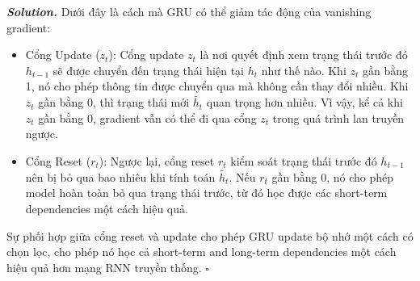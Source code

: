 \documentclass[12pt]{article}
\newenvironment{solution}[1][\it{Solution}]{\textbf{#1. } }{$\square$}
\begin{document}
\begin{solution}
	Dưới đây là cách mà GRU có thể giảm tác động của vanishing gradient:

	\begin{itemize}
		\item Cổng Update ($z_t$):
		Cổng update $z_t$ là nơi quyết định xem trạng thái trước đó $h_{t-1}$ sẽ được chuyển đến trạng thái hiện tại $h_t$ như thế nào. Khi $z_t$ gần bằng 1, nó cho phép thông tin được chuyển qua mà không cần thay đổi nhiều. Khi $z_t$ gần bằng 0, thì trạng thái mới $\tilde{h_t}$ quan trọng hơn nhiều. Vì vậy, kể cả khi $z_t$ gần bằng 0, gradient vẫn có thể đi qua cổng $z_t$ trong quá trình lan truyền ngược.
		\item Cổng Reset ($r_t$):
		Ngược lại, cổng reset $r_t$ kiểm soát trạng thái trước đó $h_{t-1}$ nên bị bỏ qua bao nhiêu khi tính toán $\tilde{h_t}$. Nếu $r_t$ gần bằng 0, nó cho phép model hoàn toàn bỏ qua trạng thái trước, từ đó học được các short-term dependencies một cách hiệu quả.
	\end{itemize}

	Sự phối hợp giữa cổng reset và update cho phép GRU update bộ nhớ một cách có chọn lọc, cho phép nó học cả short-term and long-term dependencies một cách hiệu quả hơn mạng RNN truyền thống.
\end{solution} 
\end{document}
